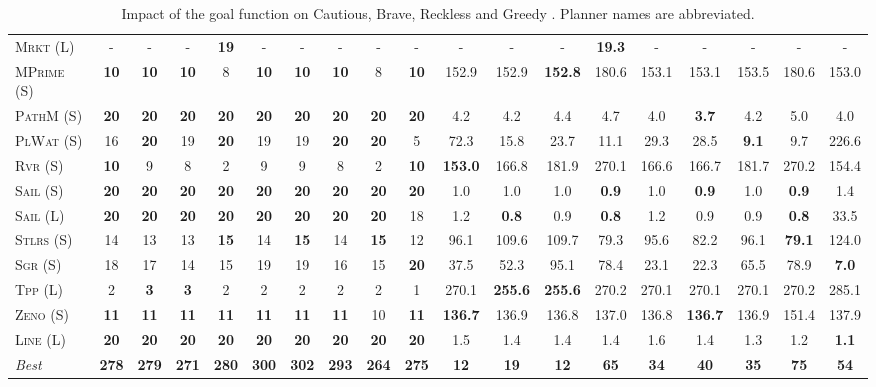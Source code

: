 \begin{table}[tb]
{\begin{tabular}{|l||ccccccccc||ccccccccc||}
\textsc{Mrkt} (L)&-&-&-&\textbf{19}&-&-&-&-&-&-&-&-&\textbf{19.3}&-&-&-&-&-\\
\textsc{MPrime} (S)&\textbf{10}&\textbf{10}&\textbf{10}&8&\textbf{10}&\textbf{10}&\textbf{10}&8&\textbf{10}&152.9&152.9&\textbf{152.8}&180.6&153.1&153.1&153.5&180.6&153.0\\
\textsc{PathM} (S)&\textbf{20}&\textbf{20}&\textbf{20}&\textbf{20}&\textbf{20}&\textbf{20}&\textbf{20}&\textbf{20}&\textbf{20}&4.2&4.2&4.4&4.7&4.0&\textbf{3.7}&4.2&5.0&4.0\\
\textsc{PlWat} (S)&16&\textbf{20}&19&\textbf{20}&19&19&\textbf{20}&\textbf{20}&5&72.3&15.8&23.7&11.1&29.3&28.5&\textbf{9.1}&9.7&226.6\\
\textsc{Rvr} (S)&\textbf{10}&9&8&2&9&9&8&2&\textbf{10}&\textbf{153.0}&166.8&181.9&270.1&166.6&166.7&181.7&270.2&154.4\\
\textsc{Sail} (S)&\textbf{20}&\textbf{20}&\textbf{20}&\textbf{20}&\textbf{20}&\textbf{20}&\textbf{20}&\textbf{20}&\textbf{20}&1.0&1.0&1.0&\textbf{0.9}&1.0&\textbf{0.9}&1.0&\textbf{0.9}&1.4\\
\textsc{Sail} (L)&\textbf{20}&\textbf{20}&\textbf{20}&\textbf{20}&\textbf{20}&\textbf{20}&\textbf{20}&\textbf{20}&18&1.2&\textbf{0.8}&0.9&\textbf{0.8}&1.2&0.9&0.9&\textbf{0.8}&33.5\\
\textsc{Stlrs} (S)&14&13&13&\textbf{15}&14&\textbf{15}&14&\textbf{15}&12&96.1&109.6&109.7&79.3&95.6&82.2&96.1&\textbf{79.1}&124.0\\
\textsc{Sgr} (S)&18&17&14&15&19&19&16&15&\textbf{20}&37.5&52.3&95.1&78.4&23.1&22.3&65.5&78.9&\textbf{7.0}\\
\textsc{Tpp} (L)&2&\textbf{3}&\textbf{3}&2&2&2&2&2&1&270.1&\textbf{255.6}&\textbf{255.6}&270.2&270.1&270.1&270.1&270.2&285.1\\
\textsc{Zeno} (S)&\textbf{11}&\textbf{11}&\textbf{11}&\textbf{11}&\textbf{11}&\textbf{11}&\textbf{11}&10&\textbf{11}&\textbf{136.7}&136.9&136.8&137.0&136.8&\textbf{136.7}&136.9&151.4&137.9\\
\textsc{Line} (L)&\textbf{20}&\textbf{20}&\textbf{20}&\textbf{20}&\textbf{20}&\textbf{20}&\textbf{20}&\textbf{20}&\textbf{20}&1.5&1.4&1.4&1.4&1.6&1.4&1.3&1.2&\textbf{1.1}
\\\hline
\textit{Best}&\textbf{278}&\textbf{279}&\textbf{271}&\textbf{280}&\textbf{300}&\textbf{302}&\textbf{293}&\textbf{264}&\textbf{275}&\textbf{12}&\textbf{19}&\textbf{12}&\textbf{65}&\textbf{34}&\textbf{40}&\textbf{35}&\textbf{75}&\textbf{54}\\\hline

        \end{tabular}}
        \caption{Impact of the goal function on Cautious, Brave, Reckless and Greedy \pattyd. Planner names are abbreviated.}
        \label{tab:abl-gf}
        \end{table}
        